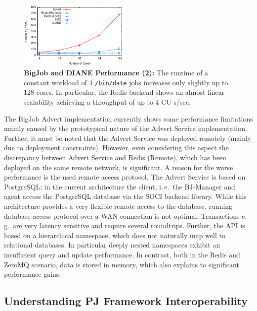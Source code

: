 \documentclass[conference,final]{IEEEtran}
\newcommand{\jhanote}[1]{ {\textcolor{red} { ***shantenu: #1 }}}
\newcommand{\alnote}[1]{ {\textcolor{blue} { ***andre: #1 }}}
\newcommand{\alnote}[1]{}
\newcommand{\jhanote}[1]{}
\newcommand{\cu}{CU\xspace}
\newcommand{\upp}{\vspace*{-0.5em}}
\begin{document}
\begin{figure}[htbp] \centering
\includegraphics[width=0.49\textwidth]{perf/bigjob-varying-cores-alamo.pdf}
\caption{\textbf{BigJob and DIANE Performance (2):}  The
runtime of a constant workload of 4 \texttt{/bin/date} jobs 
increases only slightly up to 128 cores. In particular, the Redis backend shows
an almost linear scalability achieving a throughput of up to 4 \cu s/sec. }
\label{fig:perf_bigjob-varying-cores} 
\upp\upp
\end{figure}

The BigJob Advert implementation currently shows some performance
limitations mainly caused by the prototypical nature of the Advert
Service implementation.  Further, it must be noted that the Advert
Service was deployed remotely (mainly due to deployment
constraints). However, even considering this aspect the discrepancy
between Advert Service and Redis (Remote), which has been deployed on
the same remote network, is significant. A reason for the worse
performance is the used remote access protocol. The Advert Service is
based on PostgreSQL; in the current architecture the client, i.\,e.\
the BJ-Manager and agent access the PostgreSQL database via the SOCI
backend library. While this architecture provides a very flexible
remote access to the database, running database access protocol over a
WAN connection is not optimal. %
Transactions e.\,g.\ are very latency
sensitive and require several roundtrips.  Further, the API is based
on a hierarchical namespace, which does not naturally map well to
relational databases. In particular deeply nested namespaces exhibit
an insufficient query and update performance. In contrast, both in the
Redis and ZeroMQ scenario, data is stored in memory, which also
explains to significant performance gains.

\upp

\subsection{Understanding PJ Framework Interoperability\upp\upp}
\end{document}
